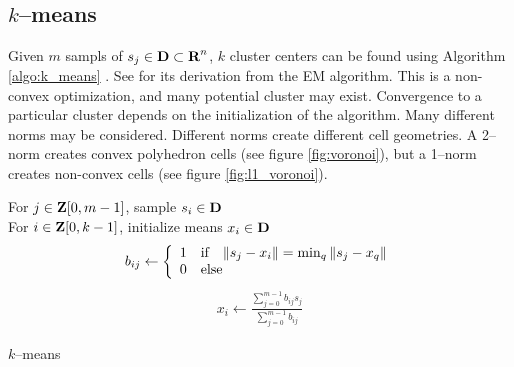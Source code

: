 \documentclass{article}
\begin{document}
\subsection{$k$--means}

Given $m$ sampls of $s_j\in\textbf{D}\subset\textbf{R}^n$, 
$k$ cluster centers can be found using Algorithm \ref{algo:k_means}
\cite[p.~149]{ml}.
See \cite[p.~195]{ml2} for its derivation from the EM algorithm. 
This is a non-convex optimization, 
and many potential cluster may exist.
Convergence to a particular cluster depends on the initialization of the
algorithm.  Many different norms may be considered. 
Different norms create different cell geometries.  
A 2--norm creates convex polyhedron cells (see figure \ref{fig:voronoi}),
but a 1--norm creates non-convex cells (see figure \ref{fig:l1_voronoi}).

    \begin{algorithm}[H]
        \SetAlgoLined
        For $j\in \textbf{Z}[0,m-1]$, sample $s_i\in\textbf{D}$\\
        For $i\in\textbf{Z}[0,k-1]$, initialize means $x_i\in\textbf{D}$\\
        {
            {
                \begin{align*}
                    b_{ij}\leftarrow\left\{\begin{array}{lllllllllllllllllll}1&\text{if}\quad \|s_j-x_i\|=\min_q\|s_j-x_q\|
                    \\
                    0 & \text{else}\end{array}\right.
                \end{align*}
            }
            {
                \begin{align*}
                    x_i\leftarrow \frac{\sum_{j=0}^{m-1} b_{ij}s_j}{\sum_{j=0}^{m-1} b_{ij}}
                \end{align*}
            }
        }
    \caption{$k$--means}
    \label{algo:k_means}
    \end{algorithm} 
\end{document}
